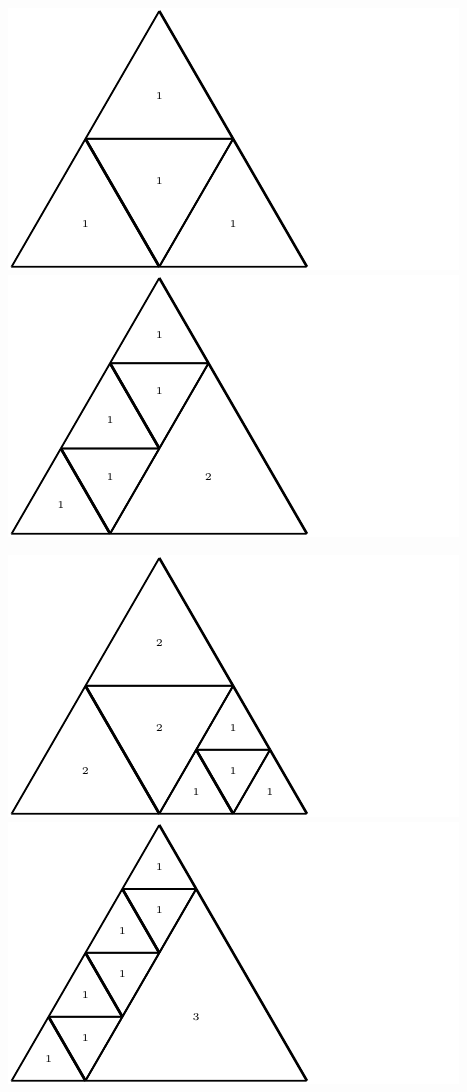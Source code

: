 \documentclass[12pt,amstags,fleqn]{article}
\theoremstyle{plain}
\theoremstyle{definition}
\theoremstyle{definition}
\begin{document}
\begin{center}
\includegraphics{max_relative_size_4.pdf}\includegraphics{max_relative_size_6.pdf}
\end{center}
\begin{center}
\includegraphics{max_relative_size_7.pdf}\includegraphics{max_relative_size_8.pdf}
\end{center}
\end{document}
